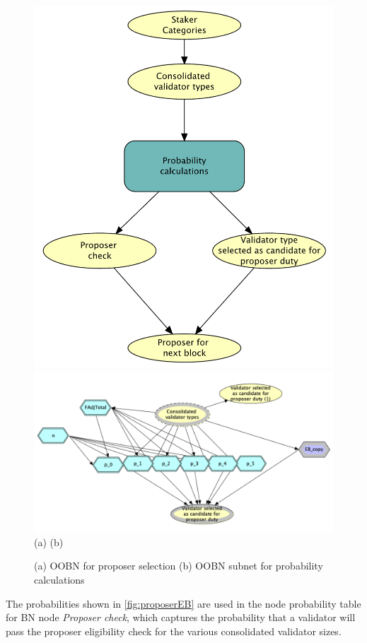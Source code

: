 \documentclass[submission,copyright,creativecommons]{eptcs}
\begin{document}
\begin{figure}[htbp]
\begin{center}
\includegraphics[width=0.29\linewidth]{images/BN-v6_collapsed}
\includegraphics[width=0.69\linewidth]{images/BN_prob_v6}
(a) \hspace{200pt} (b)
\caption{(a) OOBN for proposer selection (b) OOBN subnet for probability calculations}
\label{fig:oobn}
\end{center}
\end{figure}

The probabilities shown in \cref{fig:proposerEB} are used in the node probability table for BN node \textit{Proposer check}, which captures the probability that a validator will pass the proposer eligibility check for the various consolidated validator sizes.
\end{document}
